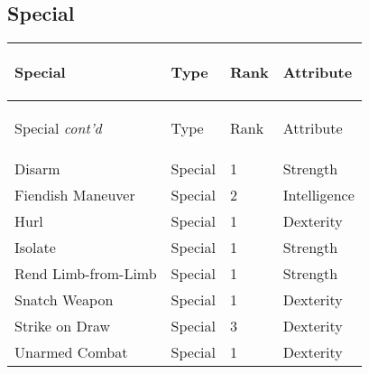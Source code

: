 \documentclass[twoside]{book}
\begin{document}
\begin{multicols}{2}
    


\hspace{-2ex}
\vspace{1ex}


    
\end{multicols}
  
    

\subsection{Special}
    
\begin{longtable}{p{1.25in}lll} 
  Special& \begin{turn}{70}{Type}\end{turn}
          & \begin{turn}{70}{Rank}\end{turn}
          & \begin{turn}{70}{Attribute}\end{turn}
          \\
  \hline
  \hline
  \endfirsthead
  Special \textit{cont'd}
        & \begin{turn}{70}{Type}\end{turn}
          & \begin{turn}{70}{Rank}\end{turn}
          & \begin{turn}{70}{Attribute}\end{turn}
           \\
  \hline
  \endhead
\raggedright  Disarm& Special& 1& Strength\tabularnewline
      \raggedright  Fiendish Maneuver& Special& 2& Intelligence\tabularnewline
      \raggedright  Hurl& Special& 1& Dexterity\tabularnewline
      \raggedright  Isolate& Special& 1& Strength\tabularnewline
      \raggedright  Rend Limb-from-Limb& Special& 1& Strength\tabularnewline
      \raggedright  Snatch Weapon& Special& 1& Dexterity\tabularnewline
      \raggedright  Strike on Draw& Special& 3& Dexterity\tabularnewline
      \raggedright  Unarmed Combat& Special& 1& Dexterity\tabularnewline
      
\end{longtable}
    
\end{document}
